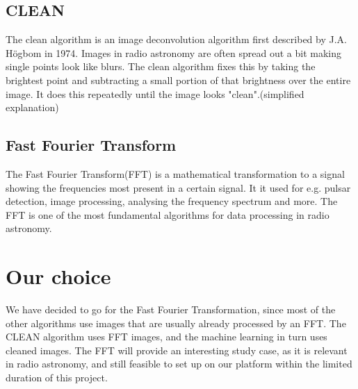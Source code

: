 \documentclass[11pt, A4, oneside]{article}
\begin{document}
\newpage

\subsection{CLEAN}

The clean algorithm is an image deconvolution algorithm first described by J.A. Högbom in 1974.\cite{CLEAN} Images in radio astronomy are often spread out a bit making single points look like blurs. The clean algorithm fixes this by taking the brightest point and subtracting a small portion of that brightness over the entire image. It does this repeatedly until the image looks "clean".(simplified explanation)

\subsection{Fast Fourier Transform}

The Fast Fourier Transform(FFT) is a mathematical transformation to a signal showing the frequencies most present in a certain signal. It it used for e.g. pulsar detection, image processing, analysing the frequency spectrum and more. The FFT is one of the most fundamental algorithms for data processing in radio astronomy. 

\section{Our choice}

We have decided to go for the Fast Fourier Transformation, since most of the other algorithms use images that are usually already processed by an FFT. The CLEAN algorithm uses FFT images, and the machine learning in turn uses cleaned images. The FFT will provide an interesting study case, as it is relevant in radio astronomy, and still feasible to set up on our platform within the limited duration of this project.    



\end{document}
